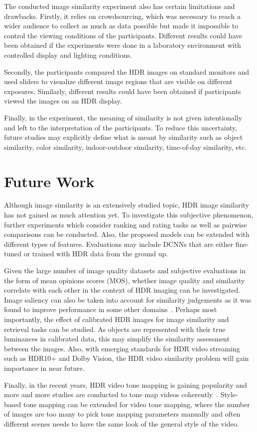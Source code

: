 The conducted image similarity experiment also has certain limitations and drawbacks. Firstly, it relies on crowdsourcing, which was necessary to reach a wider audience to collect as much as data possible but made it impossible to control the viewing conditions of the participants. Different results could have been obtained if the experiments were done in a laboratory environment with controlled display and lighting conditions.

Secondly, the participants compared the HDR images on standard monitors and used sliders to visualize different image regions that are visible on different exposures. Similarly, different results could have been obtained if participants viewed the images on an HDR display. 

Finally, in the experiment, the meaning of similarity is not given intentionally and left to the interpretation of the participants. To reduce this uncertainty, future studies may explicitly define what is meant by similarity such as object similarity, color similarity, indoor-outdoor similarity, time-of-day similarity, etc.

\section{Future Work}

Although image similarity is an extensively studied topic, HDR image similarity has not gained as much attention yet. To investigate this subjective phenomenon, further experiments which consider ranking and rating tasks as well as pairwise comparisons can be conducted. Also, the proposed models can be extended with different types of features. Evaluations may include DCNNs that are either fine-tuned or trained with HDR data from the ground up.

Given the large number of image quality datasets and subjective evaluations in the form of mean opinions scores (MOS), whether image quality and similarity correlate with each other in the context of HDR imaging can be investigated. Image saliency can also be taken into account for similarity judgements as it was found to improve performance in some other domains~\cite{amirkhani2019inpainted}. Perhaps most importantly, the effect of calibrated HDR images for image similarity and retrieval tasks can be studied. As objects are represented with their true luminances in calibrated data, this may simplify the similarity assessment between the images. Also, with emerging standards for HDR video streaming such as HDR10+ and Dolby Vision, the HDR video similarity problem will gain importance in near future.

Finally, in the recent years, HDR video tone mapping is gaining popularity and more and more studies are conducted to tone map videos coherently~\cite{eilertsen2017comparative}. Style-based tone mapping can be extended for video tone mapping, where the number of images are too many to pick tone mapping parameters manually and often different scenes needs to have the same look of the general style of the video. 
